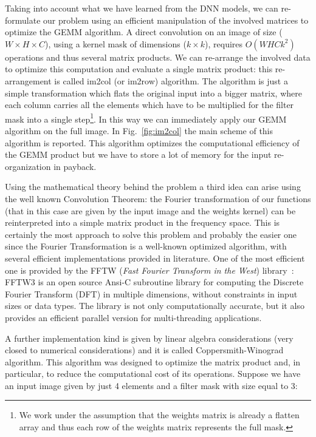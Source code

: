 \documentclass{standalone}
\begin{document}
Taking into account what we have learned from the DNN models, we can re-formulate our problem using an efficient manipulation of the involved matrices to optimize the \textsf{GEMM} algorithm.
A direct convolution on an image of size ($W\times H\times C$), using a kernel mask of dimensions ($k \times k$), requires $O(WHCk^2)$ operations and thus several matrix products.
We can re-arrange the involved data to optimize this computation and evaluate a single matrix product: this re-arrangement is called \textsf{im2col} (or \textsf{im2row}) algorithm.
The algorithm is just a simple transformation which flats the original input into a bigger matrix, where each column carries all the elements which have to be multiplied for the filter mask into a single step\footnote{
  We work under the assumption that the weights matrix is already a flatten array and thus each row of the weights matrix represents the full mask.
}.
In this way we can immediately apply our \textsf{GEMM} algorithm on the full image.
In Fig.~\ref{fig:im2col} the main scheme of this algorithm is reported.
This algorithm optimizes the computational efficiency of the \textsf{GEMM} product but we have to store a lot of memory for the input re-organization in payback.

Using the mathematical theory behind the problem a third idea can arise using the well known Convolution Theorem: the Fourier transformation of our functions (that in this case are given by the input image and the weights kernel) can be reinterpreted into a simple matrix product in the frequency space.
This is certainly the most  approach to solve this problem and probably the easier one since the Fourier Transformation is a well-known optimized algorithm, with several efficient implementations provided in literature.
One of the most efficient one is provided by the \textsf{FFTW} (\emph{Fast Fourier Transform in the West}) library~\cite{FFTW05}: \textsf{FFTW3} is an open source \textsf{Ansi-C} subroutine library for computing the Discrete Fourier Transform (DFT) in multiple dimensions, without constraints in input sizes or data types.
The library is not only computationally accurate, but it also provides an efficient parallel version for multi-threading applications.

A further implementation kind is given by linear algebra considerations (very closed to numerical considerations) and it is called \textsf{Coppersmith-Winograd algorithm}.
This algorithm was designed to optimize the matrix product and, in particular, to reduce the computational cost of its operations.
Suppose we have an input image given by just 4 elements and a filter mask with size equal to 3:
\end{document}
